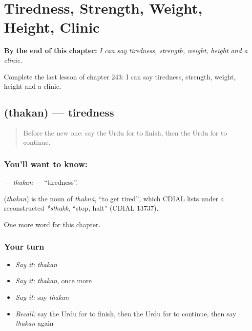 
\chapter{Tiredness, Strength, Weight, Height, Clinic}
\label{ch:ur-tiredness-strength-weight-height-clinic}

\begin{chapteropening}
\textbf{By the end of this chapter:} \emph{I can say tiredness, strength, weight, height and a clinic.}

Complete the last lesson of chapter 243: I can say tiredness, strength, weight, height and a clinic.
\end{chapteropening}

\section[\texorpdfstring{\ur{تھکن} (thakan)}{تھکن (thakan)}]{ (thakan) — tiredness}

\label{lesson:UR-C243-thakan}



\begin{quote}
Before the new one: say the Urdu for to finish, then the Urdu for to continue.
\end{quote}

\subsection*{You'll want to know: }
\textbf{} — \emph{thakan} — \textquotedblleft{}tiredness\textquotedblright{}.

\begin{cousinweb}
\textbf{} (\emph{thakan}) is the noun of \emph{thaknā}, \textquotedblleft{}to get tired\textquotedblright{}, which CDIAL lists under a reconstructed \emph{*sthakk}, \textquotedblleft{}stop, halt\textquotedblright{} (CDIAL 13737).
\end{cousinweb}

\begin{grammarlens}[title={What you've built}]
One more word for this chapter.
\end{grammarlens}

\subsection*{Your turn}
\begin{itemize}
\raggedright
  \item \emph{Say it:} \emph{thakan}
  \item \emph{Say it:} \emph{thakan}, once more
  \item \emph{Say it:} say \emph{thakan}
  \item \emph{Recall:} say the Urdu for to finish, then the Urdu for to continue, then say \emph{thakan} again
\end{itemize}

